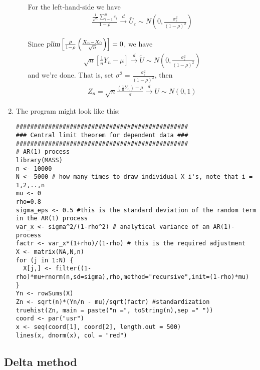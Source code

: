 \documentclass{article}
\begin{document}
\begin{solution}
\begin{enumerate}
\begin{enumerate}
        For the left-hand-side we have
        \begin{align*}
        \frac{\frac{1}{\sqrt{n}} \sum_{i=1}^n \varepsilon_i}{1-\rho} \overset{d}{\rightarrow} \tilde{U_\varepsilon} \sim N\left(0,\frac{\sigma_\varepsilon^2}{(1-\rho)^2}\right)
        \end{align*}

        Since $\textsl{plim}\left[\frac{\rho}{1-\rho}\left(\frac{X_n - X_0}{\sqrt{n}}\right)\right] = 0$, we have
        \begin{align*}
        \sqrt{n}\left[\frac{1}{n}Y_n-\mu\right] \overset{d}{\rightarrow} \tilde{U} \sim N\left(0,\frac{\sigma_\varepsilon^2}{(1-\rho)^2}\right)
        \end{align*}
        and we're done. That is, set $\sigma^2 = \frac{\sigma_\varepsilon^2}{(1-\rho)^2}$, then
        \begin{align*}
        Z_n = \sqrt{n}\frac{\left(\frac{1}{n}Y_n\right)-\mu}{\sigma} \overset{d}{\rightarrow} U \sim N(0,1)
        \end{align*}
  \end{enumerate}
  \item The program might look like this:

\begin{verbatim}
################################################
### Central limit theorem for dependent data ###
################################################
# AR(1) process
library(MASS)
n <- 10000
N <- 5000 # how many times to draw individual X_i's, note that i = 1,2,..,n
mu <- 0
rho=0.8
sigma_eps <- 0.5 #this is the standard deviation of the random term in the AR(1) process
var_x <- sigma^2/(1-rho^2) # analytical variance of an AR(1)-process
factr <- var_x*(1+rho)/(1-rho) # this is the required adjustment
X <- matrix(NA,N,n)
for (j in 1:N) {
  X[j,] <- filter((1-rho)*mu+rnorm(n,sd=sigma),rho,method="recursive",init=(1-rho)*mu)
}
Yn <- rowSums(X)
Zn <- sqrt(n)*(Yn/n - mu)/sqrt(factr) #standardization
truehist(Zn, main = paste("n =", toString(n),sep =" "))
coord <- par("usr")
x <- seq(coord[1], coord[2], length.out = 500)
lines(x, dnorm(x), col = "red")
\end{verbatim}
\end{enumerate}



\end{solution}



\subsection{Delta method\label{deltamethod}}
\end{document}
